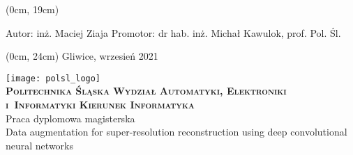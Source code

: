 {
\selectfont
\thispagestyle{empty}
\textblockorigin{3cm}{2.5cm}

\begin{onehalfspacing}
\begin{center}
    \begin{textblock*}{\textwidth}(0cm, 19cm)
	\begin{flushleft}
	Autor: inż. Maciej Ziaja \linebreak
	Promotor: dr hab. inż. Michał Kawulok, prof. Pol. Śl. \linebreak
	\end{flushleft}
	\end{textblock*}
	\begin{textblock*}{\textwidth}(0cm, 24cm)
	\fontsize{12}{12} \selectfont
	Gliwice, wrzesień 2021
	\end{textblock*}
    \vspace{2\baselineskip}
	\texttt{[image: polsl\_logo]}\\
	\vspace{2\baselineskip}
	\fontsize{18}{18} \selectfont
	\textbf{\textsc{Politechnika Śląska \linebreak
	Wydział Automatyki, Elektroniki i~Informatyki \linebreak
	Kierunek Informatyka}} \\
	\vspace{3\baselineskip}
	Praca dyplomowa magisterska \\
	\vspace{3\baselineskip}
	\fontsize{14}{14} \selectfont
	Data augmentation for super-resolution reconstruction using deep convolutional neural networks
\end{center}
\end{onehalfspacing}
\restoregeometry
}
